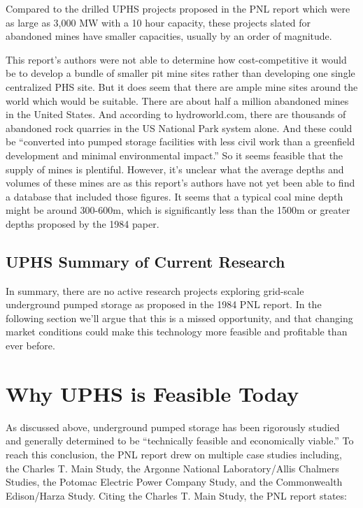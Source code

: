 \documentclass[hidelinks,12pt,a4paper]{article}
\begin{document}
Compared to the drilled UPHS projects proposed in the PNL report which were as large as 3,000 MW with a 10 hour capacity,\cite{UndergroundPumpedHydroelectricStorage} these projects slated for abandoned mines have smaller capacities, usually by an order of magnitude.

This report's authors were not able to determine how cost-competitive it would be to develop a bundle of smaller pit mine sites rather than developing one single centralized PHS site. But it does seem that there are ample mine sites around the world which would be suitable. There are about half a million abandoned mines in the United States. \cite{MappingInactiveMetalMinesAcrossTheUS} And according to hydroworld.com, there are thousands of abandoned rock quarries in the US National Park system alone. And these could be “converted into pumped storage facilities with less civil work than a greenfield development and minimal environmental impact.” \cite{PumpedStorageElmhurstQuarryProject} So it seems feasible that the supply of mines is plentiful. However, it's unclear what the average depths and volumes of these mines are as this report's authors have not yet been able to find a database that included those figures. It seems that a typical coal mine depth might be around 300-600m, \cite{UndergroundPumpedStorageHydroInAbandonedCoalMines} which is significantly less than the 1500m or greater depths proposed by the 1984 paper.


\subsection{UPHS Summary of Current Research}
In summary, there are no active research projects exploring grid-scale underground pumped storage as proposed in the 1984 PNL report. In the following section we'll argue that this is a missed opportunity, and that changing market conditions could make this technology more feasible and profitable than ever before.

\pagebreak[4]
\section{Why UPHS is Feasible Today}
As discussed above, underground pumped storage has been rigorously studied and generally determined to be “technically feasible and economically viable.” \cite{UndergroundPumpedHydroelectricStorage} To reach this conclusion, the PNL report drew on multiple case studies including, the Charles T. Main Study, the Argonne National Laboratory/Allis Chalmers Studies, the Potomac Electric Power Company Study, and the Commonwealth Edison/Harza Study. Citing the Charles T. Main Study, the PNL report states:
\end{document}
